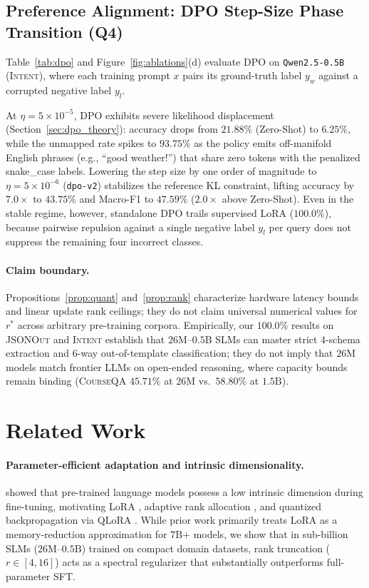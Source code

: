 \documentclass[10pt,a4paper,twocolumn]{article}
\begin{document}
\subsection{Preference Alignment: DPO Step-Size Phase Transition (Q4)}

Table~\ref{tab:dpo} and Figure~\ref{fig:ablations}(d) evaluate DPO on \texttt{Qwen2.5-0.5B} (\textsc{Intent}), where each training prompt $x$ pairs its ground-truth label $y_w$ against a corrupted negative label $y_l$.

At $\eta = 5\times 10^{-5}$, DPO exhibits severe likelihood displacement (Section~\ref{sec:dpo_theory}): accuracy drops from $21.88\%$ (Zero-Shot) to $6.25\%$, while the unmapped rate spikes to $93.75\%$ as the policy emits off-manifold English phrases (e.g., ``good weather!'') that share zero tokens with the penalized snake\_case labels. Lowering the step size by one order of magnitude to $\eta = 5\times 10^{-6}$ (\texttt{dpo-v2}) stabilizes the reference KL constraint, lifting accuracy by $7.0\times$ to $43.75\%$ and Macro-F1 to $47.59\%$ ($2.0\times$ above Zero-Shot). Even in the stable regime, however, standalone DPO trails supervised LoRA ($100.0\%$), because pairwise repulsion against a single negative label $y_l$ per query does not suppress the remaining four incorrect classes.

\paragraph{Claim boundary.}
Propositions~\ref{prop:quant} and~\ref{prop:rank} characterize hardware latency bounds and linear update rank ceilings; they do not claim universal numerical values for $r^*$ across arbitrary pre-training corpora. Empirically, our $100.0\%$ results on \textsc{JSONOut} and \textsc{Intent} establish that $26\text{M}$--$0.5\text{B}$ SLMs can master strict 4-schema extraction and 6-way out-of-template classification; they do not imply that $26\text{M}$ models match frontier LLMs on open-ended reasoning, where capacity bounds remain binding (\textsc{CourseQA} $45.71\%$ at $26\text{M}$ vs.\ $58.80\%$ at $1.5\text{B}$).

\section{Related Work}

\paragraph{Parameter-efficient adaptation and intrinsic dimensionality.}
\citet{aghajanyan2021intrinsic} showed that pre-trained language models possess a low intrinsic dimension during fine-tuning, motivating LoRA \citep{hu2022lora}, adaptive rank allocation \citep{zhang2023adalora}, and quantized backpropagation via QLoRA \citep{dettmers2023qlora}. While prior work primarily treats LoRA as a memory-reduction approximation for $7\text{B}$+ models, we show that in sub-billion SLMs ($26\text{M}$--$0.5\text{B}$) trained on compact domain datasets, rank truncation ($r \in [4, 16]$) acts as a spectral regularizer that substantially outperforms full-parameter SFT.
\end{document}

